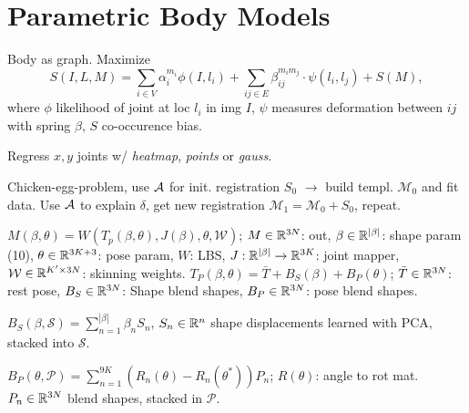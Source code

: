 \section{Parametric Body Models}
\begin{definition}
    Body as graph. Maximize
    \[S(I, L, M) = \sum_{i \in V} \alpha_i^{m_i} \phi(I, l_i) + \sum_{ij \in E} \beta_{ij}^{m_im_j} \cdot \psi(l_i, l_j) + S(M),\]
    where \(\phi\) likelihood of joint at loc \(l_i\) in img \(I\), \(\psi\) measures deformation between \(ij\) with spring \(\beta\), \(S\) co-occurence bias.
\end{definition}

\begin{definition}
    Regress \(x, y\) joints w/ \textit{heatmap}, \textit{points} or \textit{gauss}.
\end{definition}

\begin{definition}
    Chicken-egg-problem, use \(\mathcal{A}\) for init. registration \(S_0\) \(\to\) build templ. \(\mathcal{M}_0\) and fit data. Use \(\mathcal{A}\) to explain \(\delta\), get new registration \(\mathcal{M}_1 = \mathcal{M}_0 + S_0\), repeat.
\end{definition}

\begin{definition}[SMPL]
    \(M(\beta, \theta) = W(T_p(\beta, \theta), J(\beta), \theta, \mathcal{W})\); \(M \in \mathbb{R}^{3N}\): out, \(\beta \in \mathbb{R}^{|\beta|}\): shape param (10), \(\theta \in \mathbb{R}^{3K + 3}\): pose param, \(W\): LBS, \(J: \mathbb{R}^{|\beta|} \to \mathbb{R}^{3K}\): joint mapper, \(\mathcal W \in \mathbb{R}^{K' \times 3N}\): skinning weights.
    \(T_P(\beta, \theta) = \bar T + B_S(\beta) + B_P(\theta)\); \(\bar T \in \mathbb{R}^{3N}\): rest pose, \(B_S \in \mathbb{R}^{3N}\): Shape blend shapes, \(B_P \in \mathbb{R}^{3N}\): pose blend shapes.
\end{definition}

\begin{definition}
    \(B_S(\beta, \mathcal S) = \sum_{n=1}^{|\beta|} \beta_n S_n\), \(S_n \in \mathbb{R}^n\) shape displacements learned with PCA, stacked into \(\mathcal S\).
\end{definition}

\begin{definition}
    \(B_P(\theta, \mathcal P) = \sum_{n=1}^{9K}(R_n(\theta) - R_n(\theta^*))P_n\); \(R(\theta)\): angle to rot mat. \(P_n \in \mathbb{R}^{3N}\) blend shapes, stacked in \(\mathcal P\). 
\end{definition}


